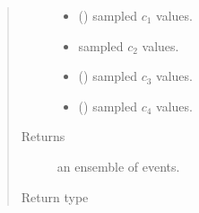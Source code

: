 \documentclass[letterpaper,10pt,english]{sphinxmanual}
\begin{document}
\begin{fulllineitems}
\begin{fulllineitems}
\begin{quote}
\begin{description}
\begin{itemize}
\item {} 
 () \textendash{} sampled \(c_1\) values.

\item {} 
 \textendash{} sampled \(c_2\) values.

\item {} 
 () \textendash{} sampled \(c_3\) values.

\item {} 
 () \textendash{} sampled \(c_4\) values.

\end{itemize}

\item[{Returns}] \leavevmode
an ensemble of  events.

\item[{Return type}] \leavevmode
{}

\end{description}\end{quote}

\end{fulllineitems}


\end{fulllineitems}

\end{document}

